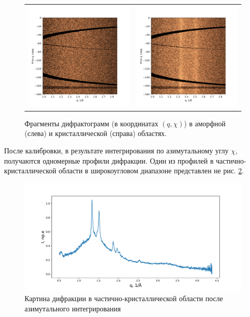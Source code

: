 		\begin{figure}[t]\center
\begin{tabular}{cc}
\includegraphics[width=0.5\linewidth]{fig/azim-amo.pdf}
&
\includegraphics[width=0.5\linewidth]{fig/azim-cryst.pdf}
\end{tabular}
\caption{Фрагменты дифрактограмм (в координатах $(q,\chi)$) в аморфной (слева) и кристаллической (справа) областях.}
\label{fig:azim}
\end{figure}
	
После калибровки, в результате интегрирования по азимутальному углу $\chi$, получаются одномерные профили дифракции. Один из профилей в частично-кристаллической области в широкоугловом диапазоне представлен не рис. \ref{fig:waxs_profile}.

\begin{figure}[h]
    \centering
    \includegraphics[width=\linewidth]{fig/profile.pdf}
    \caption{Картина дифракции в частично-кристаллической области после азимутального интегрирования}
    \label{fig:waxs_profile}
\end{figure}


